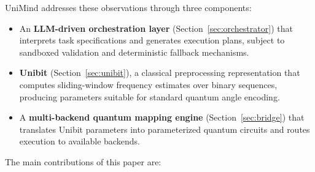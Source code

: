 ﻿\documentclass[12pt,a4paper]{article}
\begin{document}
UniMind addresses these observations through three components:

\begin{itemize}
    \item An \textbf{LLM-driven orchestration layer} (Section~\ref{sec:orchestrator}) that interprets task specifications and generates execution plans, subject to sandboxed validation and deterministic fallback mechanisms.
    \item \textbf{Unibit} (Section~\ref{sec:unibit}), a classical preprocessing representation that computes sliding-window frequency estimates over binary sequences, producing parameters suitable for standard quantum angle encoding.
    \item A \textbf{multi-backend quantum mapping engine} (Section~\ref{sec:bridge}) that translates Unibit parameters into parameterized quantum circuits and routes execution to available backends.
\end{itemize}

The main contributions of this paper are:
\end{document}
